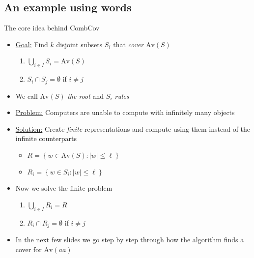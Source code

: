 \documentclass[icelandic]{beamer}
\newtheorem*{research questions}{Research questions}
\newcommand{\Av}[1]{{\mathrm{Av}\!\left(#1\right)}}
\newcommand{\CombCov}{\textsf{CombCov}}
\begin{document}
\subsection{An example using words}
\begin{frame}{The core idea behind \CombCov}
  \begin{itemize}[<+->]
    \item \underline{Goal:} Find $k$ disjoint subsets $S_i$ that \emph{cover} $\Av{S}$
    \begin{enumerate}[(1)]
      \item $\bigcup_{i \in I}{S_i} = \Av{S}$
      \item $S_i \cap S_j = \emptyset$ if $i \neq j$
    \end{enumerate}
    \item We call $\Av{S}$ \emph{the root} and $S_i$ \emph{rules}
    \item \underline{Problem:} Computers are unable to compute with infinitely many objects
    \item \underline{Solution:} Create \emph{finite} representations and compute using them instead of the infinite counterparts
    \begin{itemize}
      \item $R = \left \{ w \in \Av{S} \colon |w| \leq \ell \right \}$
      \item $R_i = \left \{ w \in S_i \colon |w| \leq \ell \right \}$
    \end{itemize}
    \item Now we solve the finite problem
    \begin{enumerate}[(1)]
      \item $\bigcup_{i \in I}{R_i} = R$
      \item $R_i \cap R_j = \emptyset$ if $i \neq j$
    \end{enumerate}
    \item In the next few slides we go step by step through how the algorithm finds a cover for $\Av{aa}$
  \end{itemize}
\end{frame}
\end{document}
